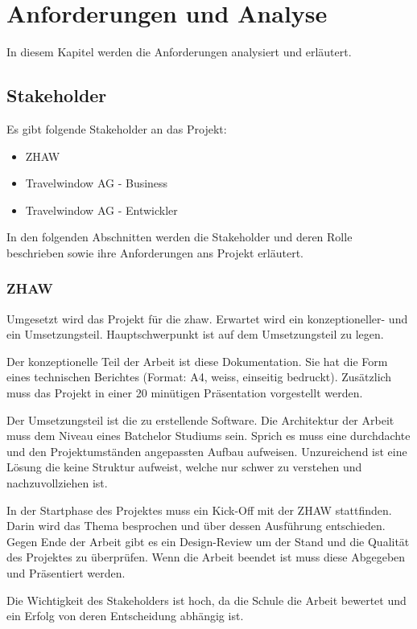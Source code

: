 

\chapter{Anforderungen und Analyse}
\label{sec:analyse}
In diesem Kapitel werden die Anforderungen analysiert und erläutert.

\section{Stakeholder}
Es gibt folgende Stakeholder an das Projekt:
\begin{itemize}
\item ZHAW
\item Travelwindow AG - Business
\item Travelwindow AG - Entwickler
\end{itemize}

In den folgenden Abschnitten werden die Stakeholder und deren Rolle beschrieben sowie ihre Anforderungen ans Projekt erläutert.

\subsection{ZHAW}
Umgesetzt wird das Projekt für die \gls{zhaw}. Erwartet wird ein konzeptioneller- und ein Umsetzungsteil. Hauptschwerpunkt ist auf dem Umsetzungsteil zu legen.

Der konzeptionelle Teil der Arbeit ist diese Dokumentation. Sie hat die Form eines technischen Berichtes (Format: A4, weiss, einseitig bedruckt). Zusätzlich muss das Projekt in einer 20 minütigen Präsentation vorgestellt werden.

Der Umsetzungsteil ist die zu erstellende Software. Die Architektur der Arbeit muss dem Niveau eines Batchelor Studiums sein. Sprich es muss eine durchdachte und den Projektumständen angepassten Aufbau aufweisen. Unzureichend ist eine Lösung die keine Struktur aufweist, welche nur schwer zu verstehen und nachzuvollziehen ist.

In der Startphase des Projektes muss ein Kick-Off mit der ZHAW stattfinden. Darin wird das Thema besprochen und über dessen Ausführung entschieden. Gegen Ende der Arbeit gibt es ein Design-Review um der Stand und die Qualität des Projektes zu überprüfen. Wenn die Arbeit beendet ist muss diese Abgegeben und Präsentiert werden.

Die Wichtigkeit des Stakeholders ist hoch, da die Schule die Arbeit bewertet und ein Erfolg von deren Entscheidung abhängig ist.

